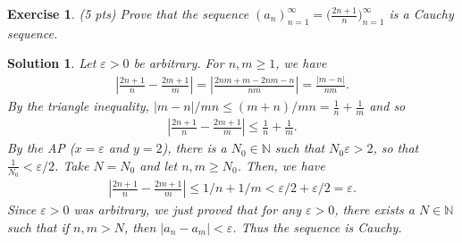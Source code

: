 \documentclass[12pt]{article}
\newcommand{\bN}{\mathbb{N}}
\theoremstyle{plain}
\newtheorem{exer}{\textbf{Exercise}}}
\theoremstyle{plain}
\newtheorem*{sol}{\textbf{Solution}}}
\theoremstyle{plain}
\theoremstyle{plain}
\begin{document}
\begin{exer}
(5 pts)
Prove that the sequence $(a_n)_{n = 1}^\infty = \Big( \frac{2n + 1}{n} \Big)_{n = 1}^\infty$ is a Cauchy sequence.
\end{exer}
\begin{sol}
Let $\varepsilon > 0$ be arbitrary. For $n , m \geq 1$, we have
	\begin{align*}
	\left| \frac{2n + 1}{n} - \frac{2m + 1}{m} \right| = \left| \frac{2nm + m - 2nm - n}{nm} \right| = \frac{|m - n|}{nm} .
	\end{align*}
By the triangle inequality, $|m - n|/mn \leq (m + n)/mn = \frac{1}{n} + \frac{1}{m}$ and so
	\begin{align*}
	\left| \frac{2n + 1}{n} - \frac{2m + 1}{m} \right| \leq \frac{1}{n} + \frac{1}{m} .
	\end{align*}
By the AP ($x = \varepsilon $ and $y = 2$), there is a $N_0 \in \bN$ such that $N_0 \varepsilon > 2$, so that $\frac{1}{N_0} < \varepsilon /2$. Take $N = N_0$ and let $n, m \geq N_0$. Then, we have
	\begin{align*}
	\left| \frac{2n + 1}{n} - \frac{2m + 1}{m} \right| \leq 1/n + 1/m < \varepsilon / 2 + \varepsilon / 2 = \varepsilon .
	\end{align*}
Since $\varepsilon > 0$ was arbitrary, we just proved that for any $\varepsilon > 0$, there exists a $N \in \bN$ such that if $n, m > N$, then $|a_n - a_m| < \varepsilon$. Thus the sequence is Cauchy.
\end{sol}
\end{document}
